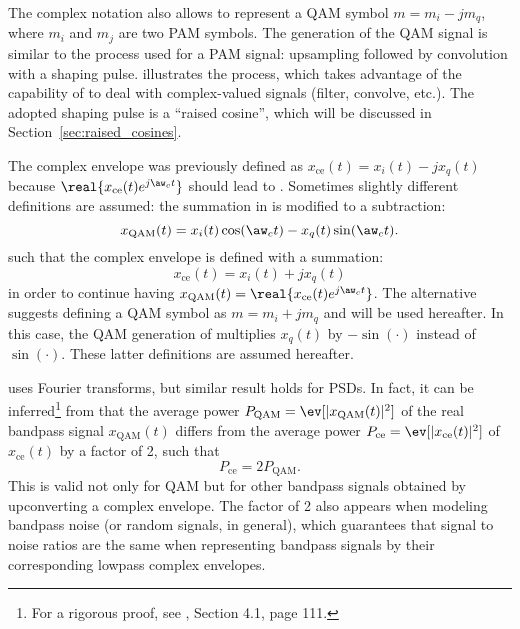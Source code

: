 

The complex notation also allows to represent a QAM symbol $m=m_i - j m_q$, where $m_i$ and $m_j$ are two PAM symbols. The generation of the QAM signal is similar to the process used for a PAM signal: upsampling followed by convolution with a shaping pulse.
 illustrates the process, which takes advantage of the capability of {\matlab} to deal with complex-valued signals (filter, convolve, etc.). 
The adopted shaping pulse is a ``raised cosine'', which will be discussed in Section~\ref{sec:raised_cosines}. 


The complex envelope was previously defined as $x_{\textrm{ce}}(t) = x_i(t) - j x_q(t)$ because $\real{ x_{\textrm{ce}}(t) e^{j \aw_c t} }$ should lead to . Sometimes slightly different definitions are assumed: the summation in  is modified to a subtraction:
\begin{equation}
x_{\textrm{QAM}}(t) = x_i(t) \cos(\aw_c t) - x_q(t) \sin(\aw_c t).
\label{eq:qam2}
\end{equation}
such that the complex envelope is defined with a summation:
\begin{equation}
x_{\textrm{ce}}(t) = x_i(t) + j x_q(t)
\label{eq:complex_envelope}
\end{equation}
in order to continue having $x_{\textrm{QAM}}(t) = \real{ x_{\textrm{ce}}(t) e^{j \aw_c t} }$. The alternative  suggests defining a QAM symbol as $m=m_i + j m_q$ and will be used hereafter. In this case, the QAM generation of  multiplies $x_q(t)$ by $-\sin(\cdot)$ instead of $\sin(\cdot)$. These latter definitions are assumed hereafter.

 uses Fourier transforms, but similar result holds for PSDs. 
In fact, it can be inferred\footnote{For a rigorous proof, see \cite{Tranter04}, Section 4.1, page 111.} from   that the average power $P_{\textrm{QAM}}=\ev [|x_{\textrm{QAM}}(t)|^2]$ of the real bandpass signal $x_{\textrm{QAM}}(t)$ differs from the average power $P_\textrm{ce} = \ev[|x_{\textrm{ce}}(t)|^2]$ of $x_{\textrm{ce}}(t) $  by a factor of 2, such that
\[
P_{\textrm{ce}} = 2 P_{\textrm{QAM}}.
\]
This is valid not only for QAM but for other bandpass signals obtained by upconverting a complex envelope. 
The factor of 2 also appears when modeling bandpass noise (or random signals, in general), which guarantees that signal to noise ratios are the same when representing bandpass signals by their corresponding lowpass complex envelopes.

